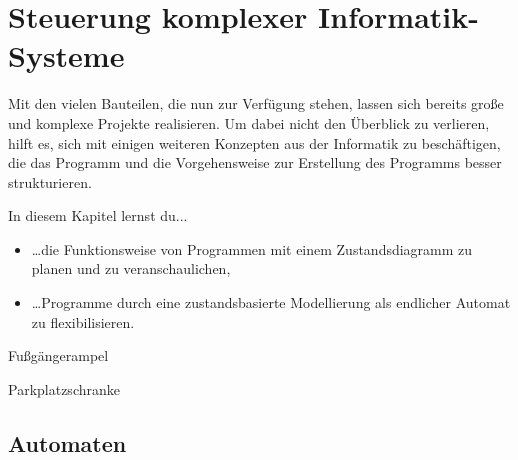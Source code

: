 \pagecolor{CadetBlue!70!green}
\chapter{Steuerung komplexer Informatik-Systeme}

Mit den vielen Bauteilen, die nun zur Verfügung stehen, lassen sich bereits große und komplexe Projekte realisieren. Um dabei nicht den Überblick zu verlieren, hilft es, sich mit einigen weiteren Konzepten aus der Informatik zu beschäftigen, die das Programm und die Vorgehensweise zur Erstellung des Programms besser strukturieren.

In diesem Kapitel lernst du...
\begin{itemize}
	\item \dots die Funktionsweise von Programmen mit einem Zustandsdiagramm zu planen und zu veranschaulichen,
	\item \dots Programme durch eine zustandsbasierte Modellierung als endlicher Automat zu flexibilisieren.
\end{itemize}

\bigskip

\begin{projektueberblick}
	\item Fußgängerampel \dotfill \pageref{proj:fussgaengerampel}
	\item Parkplatzschranke \dotfill \pageref{proj:parkplatzschranke}
\end{projektueberblick}

\newpage
\nopagecolor

\section{Automaten}




